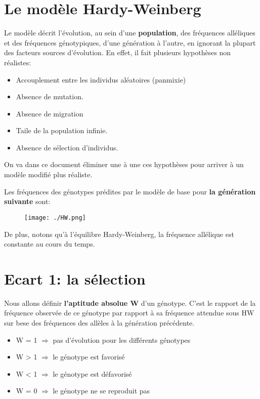 \documentclass{article}
\begin{document}
\section{Le modèle Hardy-Weinberg}
Le modèle décrit l'évolution, au sein d'une \textbf{population}, des fréquences alléliques et des fréquences génotypiques, d'une génération à l'autre, en ignorant la plupart des facteurs sources d'évolution. En effet, il fait plusieurs hypothèses non réalistes:

\begin{itemize}
\item Accouplement entre les individus aléatoires (panmixie)
\item Absence de mutation.
\item Absence de migration
\item Taile de la population infinie.
\item Absence de sélection d'individus.
\end{itemize}

On va dans ce document éliminer une à une ces hypothèses pour arriver à un modèle modifié plus réaliste.

Les fréquences des génotypes prédites par le modèle de base pour \textbf{la génération suivante} sont:

\begin{figure}[H]
\texttt{[image: ./HW.png]}
\end{figure}

De plus, notons qu'à l'équilibre Hardy-Weinberg, la fréquence allélique est constante au cours du temps.

\section{Ecart 1: la sélection}

Nous allons définir \textbf{l'aptitude absolue W} d'un génotype. C'est le rapport de la fréquence observée de ce génotype par rapport à sa fréquence attendue sous HW sur bese des fréquences des allèles à la génération précédente.

\begin{itemize}
\item W = 1 $\Rightarrow$ pas d'évolution pour les différents génotypes
\item W > 1 $\Rightarrow$ le génotype est favorisé
\item W < 1 $\Rightarrow$ le génotype est défavorisé
\item W = 0 $\Rightarrow$ le génotype ne se reproduit pas
\end{itemize}
\end{document}

